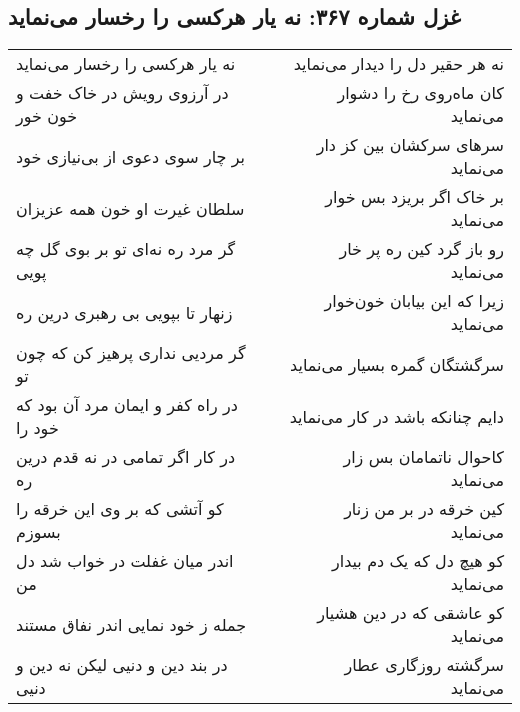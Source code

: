 \begin{center}
\section*{غزل شماره ۳۶۷: نه یار هرکسی را رخسار می‌نماید}
\label{sec:367}
\begin{longtable}{l p{0.5cm} r}
نه یار هرکسی را رخسار می‌نماید
&&
نه هر حقیر دل را دیدار می‌نماید
\\
در آرزوی رویش در خاک خفت و خون خور
&&
کان ماه‌روی رخ را دشوار می‌نماید
\\
بر چار سوی دعوی از بی‌نیازی خود
&&
سرهای سرکشان بین کز دار می‌نماید
\\
سلطان غیرت او خون همه عزیزان
&&
بر خاک اگر بریزد بس خوار می‌نماید
\\
گر مرد ره نه‌ای تو بر بوی گل چه پویی
&&
رو باز گرد کین ره پر خار می‌نماید
\\
زنهار تا بپویی بی رهبری درین ره
&&
زیرا که این بیابان خون‌خوار می‌نماید
\\
گر مردیی نداری پرهیز کن که چون تو
&&
سرگشتگان گمره بسیار می‌نماید
\\
در راه کفر و ایمان مرد آن بود که خود را
&&
دایم چنانکه باشد در کار می‌نماید
\\
در کار اگر تمامی در نه قدم درین ره
&&
کاحوال ناتمامان بس زار می‌نماید
\\
کو آتشی که بر وی این خرقه را بسوزم
&&
کین خرقه در بر من زنار می‌نماید
\\
اندر میان غفلت در خواب شد دل من
&&
کو هیچ دل که یک دم بیدار می‌نماید
\\
جمله ز خود نمایی اندر نفاق مستند
&&
کو عاشقی که در دین هشیار می‌نماید
\\
در بند دین و دنیی لیکن نه دین و دنیی
&&
سرگشته روزگاری عطار می‌نماید
\\
\end{longtable}
\end{center}
